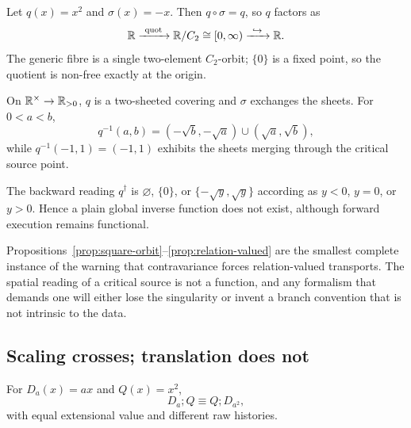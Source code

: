 \begin{proposition}\label{prop:square-orbit}
Let $q(x)=x^{2}$ and $\sigma(x)=-x$.  Then $q\circ\sigma=q$, so $q$ factors as
\[
  \R\xrightarrow{\ \mathrm{quot}\ } \R/C_2\cong[0,\infty)
  \xrightarrow{\ \hookrightarrow\ } \R .
\]
The generic fibre is a single two-element $C_2$-orbit; $\{0\}$ is a fixed point, so the
quotient is non-free exactly at the origin.
\end{proposition}

\begin{proposition}
\label{prop:square-covering}
On $\mathbb{R}^{\times}\to\mathbb{R}_{>0}$, $q$ is a two-sheeted covering and $\sigma$ exchanges the
sheets.  For $0<a<b$,
\[
  q^{-1}(a,b)=(-\sqrt b,-\sqrt a)\cup(\sqrt a,\sqrt b),
\]
while $q^{-1}(-1,1)=(-1,1)$ exhibits the sheets merging through the critical source
point.
\end{proposition}

\begin{proposition}\label{prop:relation-valued}
The backward reading $q^{\dagger}$ is $\varnothing$, $\{0\}$, or
$\{-\sqrt y,\sqrt y\}$ according as $y<0$, $y=0$, or $y>0$.  Hence a plain global
inverse function does not exist, although forward execution remains functional.
\end{proposition}

\begin{remark}
Propositions~\ref{prop:square-orbit}--\ref{prop:relation-valued} are the smallest
complete instance of the warning that contravariance forces relation-valued transports.
The spatial reading of a critical source is not a function, and any formalism that
demands one will either lose the singularity or invent a branch convention that is not
intrinsic to the data.
\end{remark}

\subsection{Scaling crosses; translation does not}

\begin{proposition}\label{prop:scaling-crosses}
For $D_a(x)=ax$ and $Q(x)=x^{2}$,
\[
  D_a;Q\equiv Q;D_{a^{2}},
\]
with equal extensional value and different raw histories.
\end{proposition}

